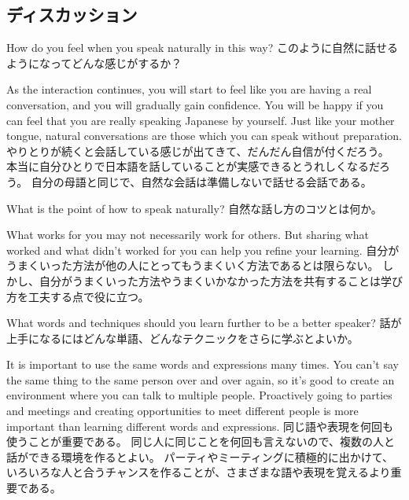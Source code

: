 \documentclass[uplatex,dvipdfmx,b5paper,english,10pt]{jsbook}
\begin{document}
\subsection{ディスカッション}
\fi

\begin{toiquestion}
\ifEnglish
How do you feel when you speak naturally in this way?
\else
このように自然に話せるようになってどんな感じがするか？
\fi
\end{toiquestion}
\begin{toianswer}
\ifEnglish
As the interaction continues, you will start to feel like you are having a real conversation, and you will gradually gain confidence.
You will be happy if you can feel that you are really speaking Japanese by yourself.
Just like your mother tongue, natural conversations are those which you can speak without preparation.
\else
やりとりが続くと会話している感じが出てきて、だんだん自信が付くだろう。
本当に自分ひとりで日本語を話していることが実感できるとうれしくなるだろう。
自分の母語と同じで、自然な会話は準備しないで話せる会話である。
\fi
\end{toianswer}


\begin{toiquestion}
\ifEnglish
What is the point of how to speak naturally?
\else
自然な話し方のコツとは何か。
\fi
\end{toiquestion}
\begin{toianswer}
\ifEnglish
What works for you may not necessarily work for others.
But sharing what worked and what didn't worked for you can help you refine your learning.
\else
自分がうまくいった方法が他の人にとってもうまくいく方法であるとは限らない。
しかし、自分がうまくいった方法やうまくいかなかった方法を共有することは学び方を工夫する点で役に立つ。
\fi
\end{toianswer}

\begin{toiquestion}
\ifEnglish
What words and techniques should you learn further to be a better speaker?
\else
話が上手になるにはどんな単語、どんなテクニックをさらに学ぶとよいか。
\fi
\end{toiquestion}
\begin{toianswer}
\ifEnglish
It is important to use the same words and expressions many times.
You can't say the same thing to the same person over and over again, so it's good to create an environment where you can talk to multiple people.
Proactively going to parties and meetings and creating opportunities to meet different people is more important than learning different words and expressions.
\else
同じ語や表現を何回も使うことが重要である。
同じ人に同じことを何回も言えないので、複数の人と話ができる環境を作るとよい。
パーティやミーティングに積極的に出かけて、いろいろな人と合うチャンスを作ることが、さまざまな語や表現を覚えるより重要である。
\fi
\end{toianswer}
\end{document}
